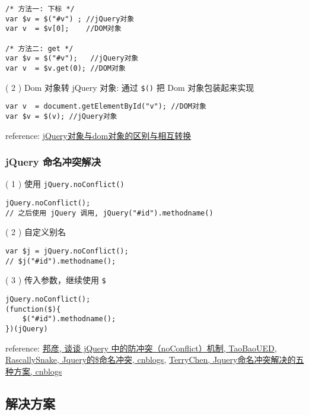 \begin{verbatim}/* 方法一: 下标 */
var $v = $("#v") ; //jQuery对象
var v  = $v[0];    //DOM对象

/* 方法二: get */
var $v = $("#v");   //jQuery对象
var v  = $v.get(0); //DOM对象
\end{verbatim}

( 2 ) Dom 对象转 jQuery 对象: 通过 \texttt{\$()} 把 Dom 对象包装起来实现

\begin{verbatim}var v  = document.getElementById("v"); //DOM对象
var $v = $(v); //jQuery对象
\end{verbatim}

reference: \href{http://segmentfault.com/a/1190000003710344}{jQuery对象与dom对象的区别与相互转换}

\subsubsection{jQuery 命名冲突解决}\hypertarget{jquery--1}{}\label{jquery--1}

( 1 ) 使用 \texttt{jQuery.noConflict()}

\begin{verbatim}jQuery.noConflict(); 
// 之后使用 jQuery 调用, jQuery("#id").methodname()
\end{verbatim}

( 2 ) 自定义别名

\begin{verbatim}var $j = jQuery.noConflict();
// $j("#id").methodname();
\end{verbatim}

( 3 ) 传入参数，继续使用 \texttt{\$}

\begin{verbatim}jQuery.noConflict(); 
(function($){ 
    $("#id").methodname();
})(jQuery)
\end{verbatim}

reference: \href{http://ued.taobao.org/blog/2013/03/jquery-noconflict/}{邦彦, 谈谈 jQuery 中的防冲突（noConflict）机制, TaoBaoUED}, \href{http://www.cnblogs.com/RascallySnake/archive/2010/05/07/1729417.html}{RascallySnake, Jquery的\$命名冲突, cnblogs}, \href{http://www.cnblogs.com/ForEvErNoME/archive/2012/03/15/2398659.html}{TerryChen, Jquery命名冲突解决的五种方案, cnblogs}

\subsection{解决方案}\hypertarget{section-10}{}\label{section-10}

